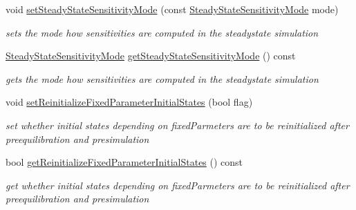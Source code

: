 \begin{DoxyCompactItemize}
void \mbox{\hyperlink{classamici_1_1_model_ab8e08cf804357e3ac070c11ac9b8ec35}{set\+Steady\+State\+Sensitivity\+Mode}} (const \mbox{\hyperlink{namespaceamici_a1f7d44f04185d57423d01d47d13470a6}{Steady\+State\+Sensitivity\+Mode}} mode)
\begin{DoxyCompactList}\small\item\em sets the mode how sensitivities are computed in the steadystate simulation \end{DoxyCompactList}\item 
\mbox{\hyperlink{namespaceamici_a1f7d44f04185d57423d01d47d13470a6}{Steady\+State\+Sensitivity\+Mode}} \mbox{\hyperlink{classamici_1_1_model_abe272de7f41f621d27d169f7918ecac3}{get\+Steady\+State\+Sensitivity\+Mode}} () const
\begin{DoxyCompactList}\small\item\em gets the mode how sensitivities are computed in the steadystate simulation \end{DoxyCompactList}\item 
void \mbox{\hyperlink{classamici_1_1_model_aaf26e3d4c8b574bc7e63f8beea677bcb}{set\+Reinitialize\+Fixed\+Parameter\+Initial\+States}} (bool flag)
\begin{DoxyCompactList}\small\item\em set whether initial states depending on fixed\+Parmeters are to be reinitialized after preequilibration and presimulation \end{DoxyCompactList}\item 
bool \mbox{\hyperlink{classamici_1_1_model_a09f372616ff7bf8073c732801b666f7e}{get\+Reinitialize\+Fixed\+Parameter\+Initial\+States}} () const
\begin{DoxyCompactList}\small\item\em get whether initial states depending on fixed\+Parmeters are to be reinitialized after preequilibration and presimulation \end{DoxyCompactList}\end{DoxyCompactItemize}
